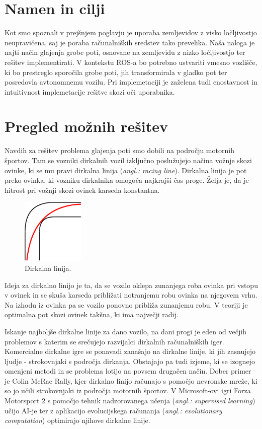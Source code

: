 \documentclass[10pt,a4paper]{article}
\begin{document}
\section{Namen in cilji}

Kot smo spoznali v prejšnjem poglavju je uporaba zemljevidov z visko ločljivostjo neupravičena, saj je poraba računalniških sredstev tako prevelika. Naša naloga je najti način glajenja grobe poti, osnovane na zemljevidu z nizko ločljivostjo ter rešitev implementirati. V kontekstu ROS-a bo potrebno ustvariti vmesno vozlišče, ki bo prestreglo sporočila grobe poti, jih transformirala v gladko pot ter posredovla avtonomnemu vozilu. Pri implemetaciji je zaželena tudi enostavnost in intuitivnost implemetacije rešitve skozi oči uporabnika.

\section{Pregled možnih rešitev}

Navdih za rešitev problema glajenja poti smo dobili na področju motornih športov. Tam se vozniki dirkalnih vozil izključno poslužujejo načina vožnje skozi ovinke, ki se mu pravi dirkalna linija (\textit{angl.: racing line}). Dirkalna linija je pot preko ovinka, ki vozniku dirkalnika omogoča najkrajši čas proge. Želja je, da je hitrost pri vožnji skozi ovinek karseda konstantna.

\begin{figure}[H]
	\centering
	\includegraphics[width=3cm]{pic/slika4.png}
	\caption{Dirkalna linija.}
	\label{fig:slika}
\end{figure}

Ideja za dirkalno linijo je ta, da se vozilo oklepa zunanjega roba ovinka pri vstopu v ovinek in se skuša karseda približati notranjemu robu ovinka na njegovem vrhu. Na izhodu iz ovinka pa se vozilo ponovno približa zunanjemu robu. V teoriji je optimalna pot skozi ovinek takšna, ki ima največji radij.

Iskanje najboljše dirkalne linije za dano vozilo, na dani progi je eden od večjih problemov s katerim se srečujejo razvijalci dirkalnih računalniških iger. Komercialne dirkalne igre se ponavadi zanašajo na dirkalne linije, ki jih zasnujejo ljudje - strokovnjaki s področja dirkanja. Obstajajo pa tudi izjeme, ki se izognejo omenjeni metodi in se problema lotijo na povsem drugačen način. Dober primer je Colin McRae Rally, kjer dirkalno linijo računajo s pomočjo nevronske mreže, ki so jo učili strokovnjaki iz področja motornih športov. V Microsoft-ovi igri Forza Motorsport 2 s pomočjo tehnik nadzorovanega učenja (\textit{angl.: supervised learning}) učijo AI-je ter z aplikacijo evolucijskega računanja (\textit{angl.: evolutionary computation}) optimirajo njihove dirkalne linije.
\end{document}

